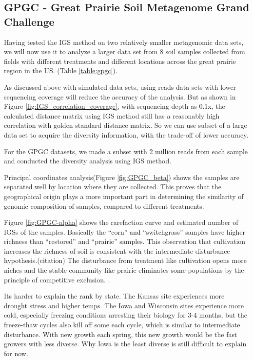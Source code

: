 \subsection{GPGC - Great Prairie Soil Metagenome Grand Challenge}

Having tested the IGS method on two relatively smaller metagenomic data sets, 
we will now use it to analyze 
a larger data set from 8 soil samples collected from fields with different treatments and
different locations across the great prairie region in the US. 
(Table \ref{table:gpgc}). 



As discussed above with simulated data sets, using reads data sets with lower sequencing coverage will reduce
the accuracy of the analysis. But as shown in Figure \ref{fig:IGS_correlation_coverage}, with sequencing depth
as 0.1x, the calculated distance matrix using IGS method still has a reasonably high correlation with golden standard
distance matrix. So we can use subset of a large data set to acquire the diversity information, with the trade-off of
lower accuracy. 

For the GPGC datasets, we made a subset with 2 million reads from each sample 
and conducted the diversity analysis
using IGS method. 

Principal coordinates analysis(Figure \ref{fig:GPGC_beta}) shows the samples are 
separated well by location where they are collected.%
This proves that the geographical origin plays a more important part in 
determining the similarity of genomic composition of samples, compared to 
different treatments.

Figure \ref{fig:GPGC-alpha} shows the rarefaction curve and estimated number 
of IGSs of the samples. Basically the ``corn'' and ``switchgrass'' samples
have higher richness than ``restored'' and ``prairie'' samples. This observation 
that cultivation increases the richness of soil 
is consistent with the intermediate disturbance hypothesis.(citation) The disturbance 
from treatment like cultivation opens more niches and the stable 
community like prairie eliminates some populations by the principle of 
competitive exclusion. . 

Its harder to explain the rank by state. 
The Kansas site experiences more drought stress and higher temps. 
The Iowa and 
Wisconsin sites experience more cold, especially freezing conditions arresting 
their biology for 3-4 months, but the freeze-thaw cycles also kill off 
some each cycle, which is similar to intermediate disturbance. With new 
growth each spring, this new growth would be the fast growers with 
less diverse. Why Iowa is the least diverse is still difficult to explain for now.

